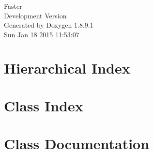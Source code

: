 \documentclass[twoside]{book}
\newcommand{\+}{\discretionary{\mbox{\scriptsize$\hookleftarrow$}}{}{}}
\newcommand{\clearemptydoublepage}{%
  \newpage{\pagestyle{empty}\cleardoublepage}%
}
\begin{document}
\hypersetup{pageanchor=false,
             bookmarks=true,
             bookmarksnumbered=true,
             pdfencoding=unicode
            }
\begin{titlepage}
\vspace*{7cm}
\begin{center}%
{\Large Faster \\[1ex]\large Development Version }\\
\vspace*{1cm}
{\large Generated by Doxygen 1.8.9.1}\\
\vspace*{0.5cm}
{\small Sun Jan 18 2015 11:53:07}\\
\end{center}
\end{titlepage}
\clearemptydoublepage
\tableofcontents
\clearemptydoublepage
{}
\hypersetup{pageanchor=true}

\chapter{Hierarchical Index}

\chapter{Class Index}

\chapter{Class Documentation}


































\backmatter
\newpage
{}
\clearemptydoublepage
{}
\printindex
\end{document}
